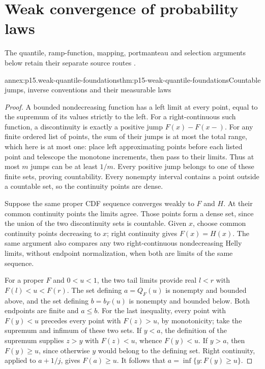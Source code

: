 \section{Weak convergence of probability laws}
\label{sec:annex-p15-weak-convergence-of-laws}

The quantile, ramp-function, mapping, portmanteau and selection
arguments below retain their separate source routes
\cite[Section~3.2, pp.~116--125]{DurrettPTEAuthor2019}.

\begin{annexitem}{annex:p15.weak-quantile-foundations}{thm:p15-weak-quantile-foundations}{Countable jumps, inverse conventions and their measurable laws}
\begin{proof}
A bounded nondecreasing function has a left limit at every
point, equal to the supremum of its values strictly to the left.
For a right-continuous such function, a discontinuity is exactly
a positive jump \(F(x)-F(x-)\). For any finite ordered list
of points, the sum of their jumps is at most the total range,
which here is at most one: place left approximating points
before each listed point and telescope the monotone increments,
then pass to their limits. Thus at most \(m\) jumps can be
at least \(1/m\). Every positive jump belongs to one of these
finite sets, proving countability. Every nonempty interval
contains a point outside a countable set, so the continuity
points are dense.

Suppose the same proper CDF sequence converges weakly to \(F\)
and \(H\). At their common continuity points the limits agree.
Those points form a dense set, since the union of the two
discontinuity sets is countable. Given \(x\), choose common
continuity points decreasing to \(x\); right continuity gives
\(F(x)=H(x)\). The same argument also compares any two
right-continuous nondecreasing Helly limits, without endpoint
normalization, when both are limits of the same sequence.

For a proper \(F\) and \(0<u<1\), the two tail limits provide
real \(l<r\) with \(F(l)<u<F(r)\). The set defining
\(a=Q_F(u)\) is nonempty and bounded above, and the set
defining \(b=b_F(u)\) is nonempty and bounded below.
Both endpoints are finite and \(a\leq b\).
For the last inequality, every point with \(F(y)<u\) precedes
every point with \(F(z)>u\), by monotonicity; take the
supremum and infimum of these two sets.
If \(y<a\), the definition of the supremum supplies \(z>y\)
with \(F(z)<u\), whence \(F(y)<u\).
If \(y>a\), then \(F(y)\geq u\), since otherwise \(y\)
would belong to the defining set. Right continuity, applied
to \(a+1/j\), gives \(F(a)\geq u\).
It follows that \(a=\inf\{y:F(y)\geq u\}\).


\end{proof}
\end{annexitem}
